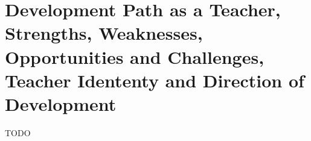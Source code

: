 \section{ Development Path as a Teacher, Strengths, Weaknesses, Opportunities and Challenges, Teacher Idententy and Direction of Development}

TODO

  